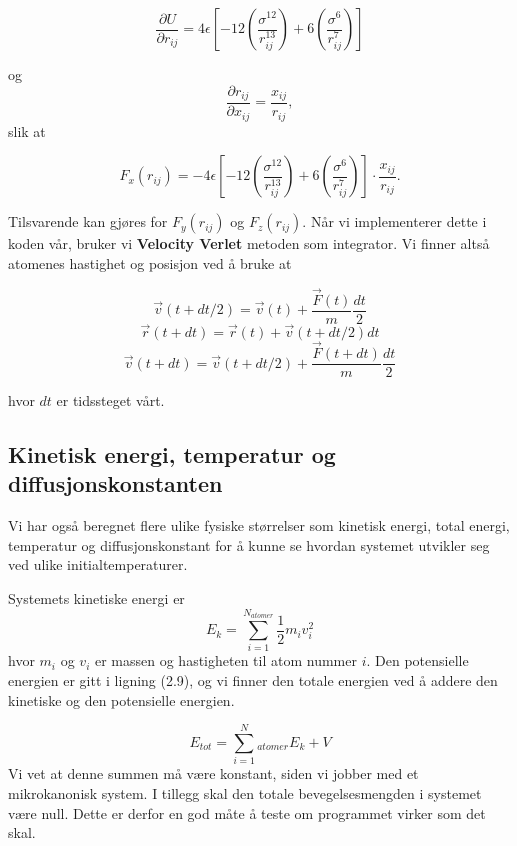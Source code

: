 \documentclass[paper=a4, fontsize=11pt]{scrartcl} %
\numberwithin{equation}{section} %
\numberwithin{figure}{section} %
\numberwithin{table}{section} %
\begin{document}
\begin{equation}
\frac{\partial U}{\partial r_{ij}} = 4 \epsilon \left[ -12 \left( \frac{\sigma^{12}}{r_{ij}^{13}} \right) + 6 \left( \frac{\sigma^6}{r_{ij}^7} \right) \right]
\end{equation}

og 
\begin{equation}
\frac{\partial r_{ij}}{\partial x_{ij}} = \frac{x_{ij}}{r_{ij}},
\end{equation}
slik at 

\begin{equation}
F_x (r_{ij}) = - 4 \epsilon \left[ -12 \left( \frac{\sigma^{12}}{r_{ij}^{13}} \right) + 6 \left( \frac{\sigma^6}{r_{ij}^7} \right) \right] \cdot \frac{x_{ij}}{r_{ij}}.
\end{equation}

Tilsvarende kan gjøres for $F_y(r_{ij})$ og $F_z(r_{ij})$. Når vi implementerer dette i koden vår, bruker vi \textbf{Velocity Verlet} metoden som integrator. Vi finner altså atomenes hastighet og posisjon ved å bruke at 

\[ \vec{v}(t + dt/2) = \vec{v}(t) + \frac{\vec{F}(t)}{m}\frac{dt}{2} \]
\[\vec{r}(t + dt) = \vec{r}(t) + \vec{v}(t + dt/2)dt \]
\[\vec{v}(t + dt) = \vec{v}(t + dt/2) + \frac{\vec{F}(t + dt)}{m} \frac{dt}{2} \]

hvor $dt$ er tidssteget vårt.


\subsection{Kinetisk energi, temperatur og diffusjonskonstanten}
Vi har også beregnet flere ulike fysiske størrelser som kinetisk energi, total energi, temperatur og diffusjonskonstant for å kunne se hvordan systemet utvikler seg ved ulike initialtemperaturer. 

Systemets kinetiske energi er 
\begin{equation}
E_k = \sum_{i=1}^{N_{atomer}} \frac{1}{2}m_iv_i^2
\end{equation}
hvor $m_i$ og $v_i$ er massen og hastigheten til atom nummer $i$. Den potensielle energien er gitt i ligning (2.9), og vi finner den totale energien ved å addere den kinetiske og den potensielle energien. 

\begin{equation}
E_{tot} = \sum_{i=1}^N_{atomer} E_k + V
\end{equation}
Vi vet at denne summen må være konstant, siden vi jobber med et mikrokanonisk system. I tillegg skal den totale bevegelsesmengden i systemet være null. Dette er derfor en god måte å teste om programmet virker som det skal.
\end{document}
